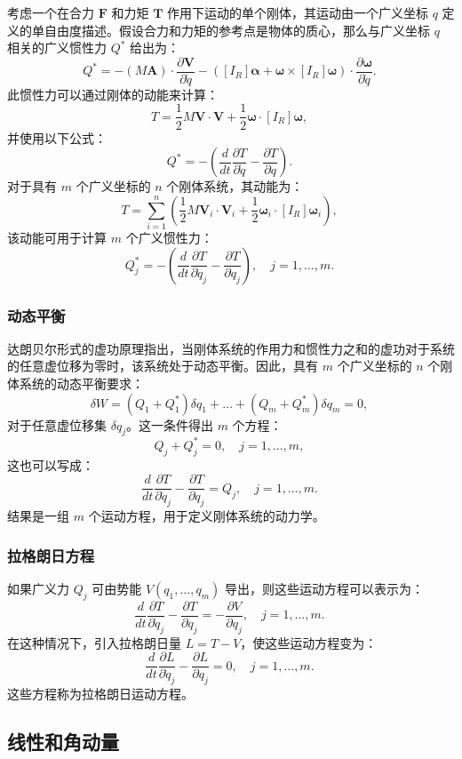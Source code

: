 考虑一个在合力 \( \mathbf{F} \) 和力矩 \( \mathbf{T} \) 作用下运动的单个刚体，其运动由一个广义坐标 \( q \) 定义的单自由度描述。假设合力和力矩的参考点是物体的质心，那么与广义坐标 \( q \) 相关的广义惯性力 \( Q^* \) 给出为：
\[
Q^* = - (M \mathbf{A}) \cdot \frac{\partial \mathbf{V}}{\partial \dot{q}} - \left( [I_R] \boldsymbol{\alpha} + \boldsymbol{\omega} \times [I_R] \boldsymbol{\omega} \right) \cdot \frac{\partial \boldsymbol{\omega}}{\partial \dot{q}}.~
\]
此惯性力可以通过刚体的动能来计算：
\[
T = \frac{1}{2} M \mathbf{V} \cdot \mathbf{V} + \frac{1}{2} \boldsymbol{\omega} \cdot [I_R] \boldsymbol{\omega},~
\]
并使用以下公式：
\[
Q^* = - \left( \frac{d}{dt} \frac{\partial T}{\partial \dot{q}} - \frac{\partial T}{\partial q} \right).~
\]
对于具有 \( m \) 个广义坐标的 \( n \) 个刚体系统，其动能为：
\[
T = \sum_{i=1}^{n} \left( \frac{1}{2} M \mathbf{V}_i \cdot \mathbf{V}_i + \frac{1}{2} \boldsymbol{\omega}_i \cdot [I_R] \boldsymbol{\omega}_i \right),~
\]
该动能可用于计算 \( m \) 个广义惯性力：
\[
Q_j^* = - \left( \frac{d}{dt} \frac{\partial T}{\partial \dot{q}_j} - \frac{\partial T}{\partial q_j} \right), \quad j = 1, \dots, m.~
\]
\subsubsection{动态平衡}
达朗贝尔形式的虚功原理指出，当刚体系统的作用力和惯性力之和的虚功对于系统的任意虚位移为零时，该系统处于动态平衡。因此，具有 \( m \) 个广义坐标的 \( n \) 个刚体系统的动态平衡要求：
\[
\delta W = \left(Q_{1} + Q_{1}^{*}\right) \delta q_{1} + \dots + \left(Q_{m} + Q_{m}^{*}\right) \delta q_{m} = 0,~
\]
对于任意虚位移集 \( \delta q_j \)。这一条件得出 \( m \) 个方程：
\[
Q_j + Q_j^* = 0, \quad j = 1, \dots, m,~
\]
这也可以写成：
\[
\frac{d}{dt} \frac{\partial T}{\partial \dot{q}_j} - \frac{\partial T}{\partial q_j} = Q_j, \quad j = 1, \dots, m.~
\]
结果是一组 \( m \) 个运动方程，用于定义刚体系统的动力学。
\subsubsection{拉格朗日方程}
如果广义力 \( Q_j \) 可由势能 \( V(q_1, \dots, q_m) \) 导出，则这些运动方程可以表示为：
\[
\frac{d}{dt} \frac{\partial T}{\partial \dot{q}_j} - \frac{\partial T}{\partial q_j} = -\frac{\partial V}{\partial q_j}, \quad j = 1, \dots, m.~
\]
在这种情况下，引入拉格朗日量 \( L = T - V \)，使这些运动方程变为：
\[
\frac{d}{dt} \frac{\partial L}{\partial \dot{q}_j} - \frac{\partial L}{\partial q_j} = 0, \quad j = 1, \dots, m.~
\]
这些方程称为拉格朗日运动方程。
\subsection{线性和角动量}
